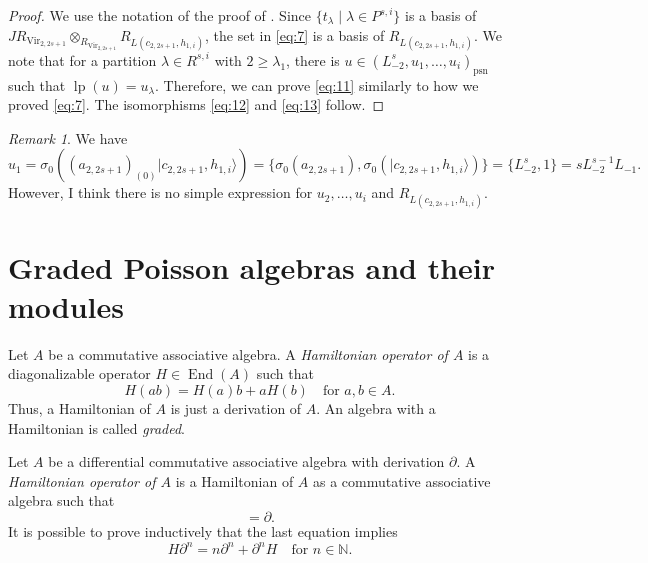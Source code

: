 \documentclass[a4paper, 12pt, reqno]{amsart}
\theoremstyle{remark}
\newtheorem{remark}[theorem]{Remark}
\DeclareMathOperator{\Vir}{Vir}
\DeclareMathOperator{\lp}{lp}
\DeclareMathOperator{\End}{End}
\DeclareMathOperator{\psn}{psn}
\begin{document}
\begin{proof}
  We use the notation of the proof of .
  Since $\{t_{\lambda} \mid \lambda \in P^{s, i}\}$ is a basis of $JR_{\Vir_{2, 2s + 1}} \otimes_{R_{\Vir_{2, 2s + 1}}} R_{L(c_{2, 2s + 1}, h_{1, i})}$, the set in \eqref{eq:7} is a basis of $R_{L(c_{2, 2s + 1}, h_{1, i})}$.
  We note that for a partition $\lambda \in R^{s, i}$ with $2 \ge \lambda_1$, there is $u \in (L_{-2}^s, u_1, \dots, u_i)_{\psn}$ such that $\lp(u) = u_{\lambda}$.
  Therefore, we can prove \eqref{eq:11} similarly to how we proved \eqref{eq:7}.
  The isomorphisms \eqref{eq:12} and \eqref{eq:13} follow.
\end{proof}

\begin{remark}
  \label{rmk:6}
  We have
  \begin{equation*}
    u_1 = \sigma_0((a_{2, 2s + 1})_{(0)}|c_{2, 2s + 1}, h_{1, i}\rangle) = \{\sigma_0(a_{2, 2s + 1}), \sigma_0(|c_{2, 2s + 1}, h_{1, i}\rangle)\} = \{L_{-2}^s, 1\} = sL_{-2}^{s - 1}L_{-1}.
  \end{equation*}
  However, I think there is no simple expression for $u_2, \dots, u_i$ and $R_{L(c_{2, 2s + 1}, h_{1, i})}$.
\end{remark}

\appendix
\section{Graded Poisson algebras and their modules}
\label{sec:grad-poiss-algeb}

Let $A$ be a commutative associative algebra.
A \emph{Hamiltonian operator of $A$} is a diagonalizable operator $H \in \End(A)$ such that
\begin{equation*}
  H(ab) = H(a)b + aH(b) \quad \text{for $a, b \in A$}.
\end{equation*}
Thus, a Hamiltonian of $A$ is just a derivation of $A$.
An algebra with a Hamiltonian is called \emph{graded}.

Let $A$ be a differential commutative associative algebra with derivation $\partial$.
A \emph{Hamiltonian operator of $A$} is a Hamiltonian of $A$ as a commutative associative algebra such that
\begin{equation*}
  [H, \partial] = \partial.
\end{equation*}
It is possible to prove inductively that the last equation implies
\begin{equation}
  \label{eq:14}
  H\partial^n = n\partial^n + \partial^nH \quad \text{for $n \in \mathbb{N}$}.
\end{equation}
\end{document}
